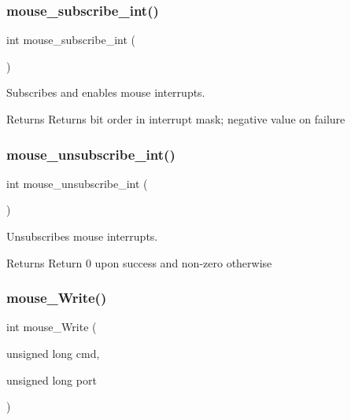 \subsubsection{\texorpdfstring{mouse\+\_\+subscribe\+\_\+int()}{mouse\_subscribe\_int()}}
{\footnotesize\ttfamily int mouse\+\_\+subscribe\+\_\+int (\begin{DoxyParamCaption}{ }\end{DoxyParamCaption})}



Subscribes and enables mouse interrupts. 

\begin{DoxyReturn}{Returns}
Returns bit order in interrupt mask; negative value on failure 
\end{DoxyReturn}
\mbox{\label{group___mouse_ga685ad2706aca36d9869a30a19b9f446a}} 
\subsubsection{\texorpdfstring{mouse\+\_\+unsubscribe\+\_\+int()}{mouse\_unsubscribe\_int()}}
{\footnotesize\ttfamily int mouse\+\_\+unsubscribe\+\_\+int (\begin{DoxyParamCaption}{ }\end{DoxyParamCaption})}



Unsubscribes mouse interrupts. 

\begin{DoxyReturn}{Returns}
Return 0 upon success and non-\/zero otherwise 
\end{DoxyReturn}
\mbox{\label{group___mouse_gae7c331cf6f4c63d80b6bce11c2c8e771}} 
\subsubsection{\texorpdfstring{mouse\+\_\+\+Write()}{mouse\_Write()}}
{\footnotesize\ttfamily int mouse\+\_\+\+Write (\begin{DoxyParamCaption}\item[{unsigned long}]{cmd,  }\item[{unsigned long}]{port }\end{DoxyParamCaption})}



